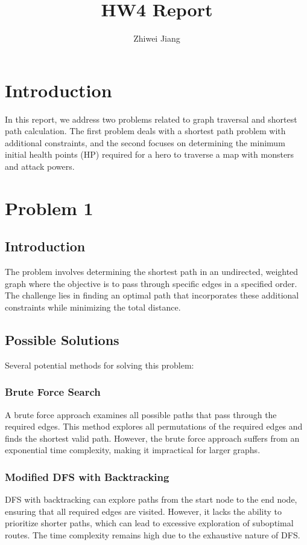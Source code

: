 \documentclass{article}
\title{HW4 Report}
\author{Zhiwei Jiang}
\begin{document}
\maketitle

\section{Introduction}

In this report, we address two problems related to graph traversal and shortest path calculation. The first problem deals with a shortest path problem with additional constraints, and the second focuses on determining the minimum initial health points (HP) required for a hero to traverse a map with monsters and attack powers.

\section{Problem 1}

\subsection{Introduction}
The problem involves determining the shortest path in an undirected, weighted graph where the objective is to pass through specific edges in a specified order. The challenge lies in finding an optimal path that incorporates these additional constraints while minimizing the total distance.

\subsection{Possible Solutions}
Several potential methods for solving this problem:

\subsubsection{Brute Force Search}
A brute force approach examines all possible paths that pass through the required edges. This method explores all permutations of the required edges and finds the shortest valid path. However, the brute force approach suffers from an exponential time complexity, making it impractical for larger graphs.

\subsubsection{Modified DFS with Backtracking}
DFS with backtracking can explore paths from the start node to the end node, ensuring that all required edges are visited. However, it lacks the ability to prioritize shorter paths, which can lead to excessive exploration of suboptimal routes. The time complexity remains high due to the exhaustive nature of DFS.
\end{document}
